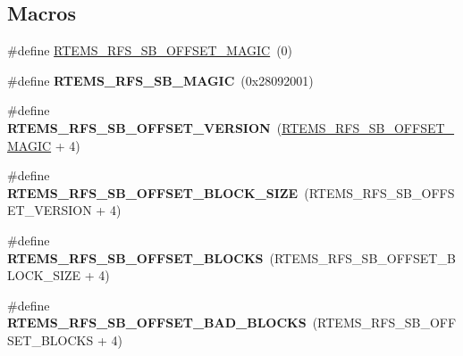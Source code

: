\subsection*{Macros}
\begin{DoxyCompactItemize}
\item 
\#define \mbox{\hyperlink{rtems-rfs-file-system_8h_a060465c5d3264daf2ab6e5cbdf491520}{R\+T\+E\+M\+S\+\_\+\+R\+F\+S\+\_\+\+S\+B\+\_\+\+O\+F\+F\+S\+E\+T\+\_\+\+M\+A\+G\+IC}}~(0)
\item 
\mbox{\label{rtems-rfs-file-system_8h_ae9df013b3c9327dddb845d31d2803185}} 
\#define {\bfseries R\+T\+E\+M\+S\+\_\+\+R\+F\+S\+\_\+\+S\+B\+\_\+\+M\+A\+G\+IC}~(0x28092001)
\item 
\mbox{\label{rtems-rfs-file-system_8h_a7edfbf76e5a4191f0e34b238f6accb35}} 
\#define {\bfseries R\+T\+E\+M\+S\+\_\+\+R\+F\+S\+\_\+\+S\+B\+\_\+\+O\+F\+F\+S\+E\+T\+\_\+\+V\+E\+R\+S\+I\+ON}~(\mbox{\hyperlink{rtems-rfs-file-system_8h_a060465c5d3264daf2ab6e5cbdf491520}{R\+T\+E\+M\+S\+\_\+\+R\+F\+S\+\_\+\+S\+B\+\_\+\+O\+F\+F\+S\+E\+T\+\_\+\+M\+A\+G\+IC}}           + 4)
\item 
\mbox{\label{rtems-rfs-file-system_8h_adc181eb5282ec74ea4cf25d8e3749f36}} 
\#define {\bfseries R\+T\+E\+M\+S\+\_\+\+R\+F\+S\+\_\+\+S\+B\+\_\+\+O\+F\+F\+S\+E\+T\+\_\+\+B\+L\+O\+C\+K\+\_\+\+S\+I\+ZE}~(R\+T\+E\+M\+S\+\_\+\+R\+F\+S\+\_\+\+S\+B\+\_\+\+O\+F\+F\+S\+E\+T\+\_\+\+V\+E\+R\+S\+I\+ON         + 4)
\item 
\mbox{\label{rtems-rfs-file-system_8h_a992378ae6ab41717daa46f9389f91ef8}} 
\#define {\bfseries R\+T\+E\+M\+S\+\_\+\+R\+F\+S\+\_\+\+S\+B\+\_\+\+O\+F\+F\+S\+E\+T\+\_\+\+B\+L\+O\+C\+KS}~(R\+T\+E\+M\+S\+\_\+\+R\+F\+S\+\_\+\+S\+B\+\_\+\+O\+F\+F\+S\+E\+T\+\_\+\+B\+L\+O\+C\+K\+\_\+\+S\+I\+ZE      + 4)
\item 
\mbox{\label{rtems-rfs-file-system_8h_a46043e235371f5f2c17c4e3af9cd6fd1}} 
\#define {\bfseries R\+T\+E\+M\+S\+\_\+\+R\+F\+S\+\_\+\+S\+B\+\_\+\+O\+F\+F\+S\+E\+T\+\_\+\+B\+A\+D\+\_\+\+B\+L\+O\+C\+KS}~(R\+T\+E\+M\+S\+\_\+\+R\+F\+S\+\_\+\+S\+B\+\_\+\+O\+F\+F\+S\+E\+T\+\_\+\+B\+L\+O\+C\+KS          + 4)
\item 
\mbox{\label{rtems-rfs-file-system_8h_a2b34c5e1d83d8da835f6c5e80e7ad3b9}} 

\end{DoxyCompactItemize}
